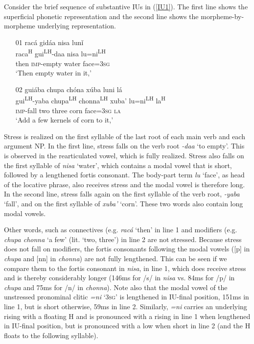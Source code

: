 Consider the brief sequence of substantive IUs in (\ref{IU1}). The first line shows the superficial phonetic representation and the second line shows the morpheme-by-morpheme underlying representation.


\ea\label{IU1}
\begin{itemize}
\item[01]
\glll rac\'{a} gid\'{a}a nisa lun\v{i} \\
raca\textsuperscript{H} gui\textsuperscript{LH}-daa nisa lu=ni\textsuperscript{LH}	\\
then \textsc{imp}-empty water face=\textsc{3sg} \\
\glt `Then empty water in it,'



\item[02]
\glll gui\'{a}ba chupa ch\'{o}na x\'{u}ba luni l\'{a} \\
gui\textsuperscript{LH}-yaba chupa\textsuperscript{LH} chonna\textsuperscript{LH} xuba' lu=ni\textsuperscript{LH} la\textsuperscript{H}	\\
\textsc{imp}-fall two three corn face=\textsc{3sg} \textsc{la} \\
\glt `Add a few kernels of corn to it,'

\end{itemize}
\z

Stress is realized on the first syllable of the last root of each main verb and each argument NP. In the first line, stress falls on the verb root \textit{-daa} `to empty'. This is observed in the rearticulated vowel, which is fully realized. Stress also falls on the first syllable of \textit{nisa} `water', which contains a modal vowel that is short, followed by a lengthened fortis consonant. The body-part term \textit{lu} `face', as head of the locative phrase, also receives stress and the modal vowel is therefore long. In the second line, stress falls again on the first syllable of the verb root, \textit{-yaba} `fall', and on the first syllable of \textit{xuba'} `corn'. These two words also contain long modal vowels. 

Other words, such as connectives (e.g. \textit{rac\'{a}} `then' in line 1 and modifiers (e.g. \textit{chupa chonna} `a few' (lit. `two, three') in line 2 are not stressed. Because stress does not fall on modifiers, the fortis consonants following the modal vowels ([p] in \textit{chupa} and [nn] in \textit{chonna}) are not fully lengthened. This can be seen if we compare them to the fortis consonant in \textit{nisa}, in line 1, which does receive stress and is thereby considerably longer (146ms for /s/ in \textit{nisa} vs. 84ms for /p/ in \textit{chupa} and 75ms for /n/ in \textit{chonna}). Note also that the modal vowel of the unstressed pronominal clitic \textit{=ni} `3\textsc{sg}' is lengthened in IU-final position, 151ms in line 1, but is short otherwise, 59ms in line 2. Similarly, \textit{=ni}  carries an underlying rising  with a floating H and is pronounced with a rising  in line 1 when lengthened in IU-final position, but is pronounced with a low  when short in line 2 (and the H  floats to the following syllable).

